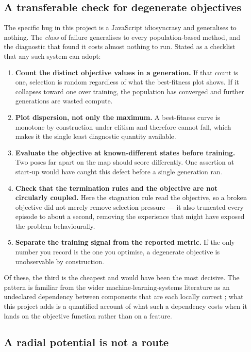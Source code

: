\documentclass[conference]{IEEEtran}
\begin{document}
\subsection{A transferable check for degenerate objectives}

The specific bug in this project is a JavaScript idiosyncrasy and generalises to nothing. The \emph{class} of failure generalises to every population-based method, and the diagnostic that found it costs almost nothing to run. Stated as a checklist that any such system can adopt:

\begin{enumerate}
\item \textbf{Count the distinct objective values in a generation.} If that count is one, selection is random regardless of what the best-fitness plot shows. If it collapses toward one over training, the population has converged and further generations are wasted compute.
\item \textbf{Plot dispersion, not only the maximum.} A best-fitness curve is monotone by construction under elitism and therefore cannot fall, which makes it the single least diagnostic quantity available.
\item \textbf{Evaluate the objective at known-different states before training.} Two poses far apart on the map should score differently. One assertion at start-up would have caught this defect before a single generation ran.
\item \textbf{Check that the termination rules and the objective are not circularly coupled.} Here the stagnation rule read the objective, so a broken objective did not merely remove selection pressure — it also truncated every episode to about a second, removing the experience that might have exposed the problem behaviourally.
\item \textbf{Separate the training signal from the reported metric.} If the only number you record is the one you optimise, a degenerate objective is unobservable by construction.
\end{enumerate}

Of these, the third is the cheapest and would have been the most decisive. The pattern is familiar from the wider machine-learning-systems literature as an undeclared dependency between components that are each locally correct \cite{sculley}; what this project adds is a quantified account of what such a dependency costs when it lands on the objective function rather than on a feature.

\subsection{A radial potential is not a route}
\end{document}
